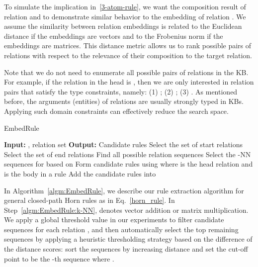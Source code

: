 \documentclass{article} \usepackage{iclr2015,times}
\begin{document}
To simulate the implication in~\ref{3-atom-rule}, we want the composition result of relation  and  to demonstrate similar behavior to the embedding of relation . We assume the similarity between relation embeddings is related to the Euclidean distance if the embeddings are vectors and to the Frobenius norm if the embeddings are matrices. This distance metric allows us to rank possible pairs of relations with respect to the relevance of their composition to the target relation. 

Note that we do not need to enumerate all possible pairs of relations in the KB. For example, if the relation in the head is , then we are only interested in relation pairs  that satisfy the type constraints, namely: (1) ; (2) ; (3) . As mentioned before, the arguments (entities) of relations are usually strongly typed in KBs. Applying such domain constraints can effectively reduce the search space. 

\begin{algorithm}
\caption{{\sc EmbedRule}}
\label{rule_extraction_alg}
\begin{algorithmic}[1]
\State \textbf{Input:} , relation set 
\State \textbf{Output:} Candidate rules 
    \State Select the set of start relations  
    \State Select the set of end relations 
    \State Find all possible relation sequences 
    \label{algm:EmbedRule:seq}
    \State Select the -NN sequences  for  based on  \label{algm:EmbedRule:k-NN}    
    \State Form candidate rules using  where  is the head relation and  is the body in a rule
    \State Add the candidate rules into 
\EndFor
\end{algorithmic}
\label{algm:EmbedRule}
\end{algorithm}

In Algorithm~\ref{algm:EmbedRule}, we describe our rule extraction algorithm for general closed-path Horn rules as in Eq.~\eqref{horn_rule}. In Step~\ref{algm:EmbedRule:k-NN},  denotes vector addition or matrix multiplication. We apply a global threshold value  in our experiments to filter candidate sequences for each relation , and then automatically select the top remaining sequences by applying a heuristic thresholding strategy based on the difference of the distance scores: sort the sequences by increasing distance  and set the cut-off point to be the -th sequence where .  
\end{document}
